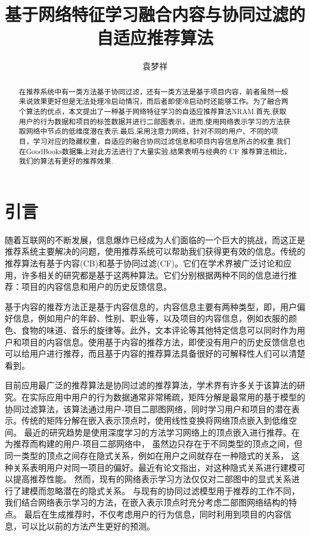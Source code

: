 \documentclass[lang=cn,11pt]{elegantpaper}
\title{基于网络特征学习融合内容与协同过滤的自适应推荐算法}
\author{袁梦祥}
\institute{安徽大学大数据与云服务工程实验室}
\date{}
\begin{document}
\maketitle

\begin{abstract}
	
\noindent 在推荐系统中有一类方法基于协同过滤，还有一类方法是基于项目内容，前者虽然一般来说效果更好但是无法处理冷启动情况，而后者即使冷启动时还能够工作。为了融合两个算法的优点，本文提出了一种基于网络特征学习的自适应推荐算法NRAM.首先,获取用户的行为数据和项目的标签数据并进行二部图表示，进而,使用网络表示学习的方法获取网络中节点的低维度潜在表示.最后,采用注意力网络，针对不同的用户、不同的项目，学习对应的隐藏权重，自适应的融合协同过滤信息和项目内容信息所占的权重.我们在GoodBooks数据集上对此方法进行了大量实验,结果表明与经典的 CF 推荐算法相比，我们的算法有更好的推荐效果.

\end{abstract}


\section{引言}

随着互联网的不断发展，信息爆炸已经成为人们面临的一个巨大的挑战，而这正是推荐系统主要解决的问题，使用推荐系统可以帮助我们获得更有效的信息。传统的推荐算法有基于内容(CB)和基于协同过滤(CF)。它们在学术界被广泛讨论和应用，许多相关的研究都是基于这两种算法。它们分别根据两种不同的信息进行推荐：项目的内容信息和用户的历史反馈信息。

基于内容的推荐方法正是基于内容信息的，内容信息主要有两种类型，即，用户偏好信息，例如用户的年龄、性别、职业等，以及项目的内容信息，例如衣服的颜色、食物的味道、音乐的旋律等。此外，文本评论等其他特定信息可以同时作为用户和项目的内容信息。使用基于内容的推荐方法，即使没有用户的历史反馈信息也可以给用户进行推荐，而且基于内容的推荐算法具备很好的可解释性\cite{Vig2008}人们可以清楚看到。

目前应用最广泛的推荐算法是协同过滤的推荐算法，学术界有许多关于该算法的研究\cite{Linden2003,Miranda2009,Sarwar2001a,Su2009}。在实际应用中用户的行为数据通常非常稀疏，矩阵分解是最常用的基于模型的协同过滤算法\cite{Salakhutdinov2007,Koren2009}，该算法通过用户-项目二部图网络，同时学习用户和项目的潜在表示。传统的矩阵分解在嵌入表示顶点时，使用线性变换将网络顶点嵌入到低维空间。
最近的研究趋势是使用深度学习的方法学习网络上的顶点嵌入\cite{He2017}进行推荐。在为推荐而构建的用户-项目二部网络中，
虽然边只存在于不同类型的顶点之间，但同一类型的顶点之间存在隐式关系，例如在用户之间就存在一种隐式的关系，
这种关系表明用户对同一项目的偏好。最近有论文指出，对这种隐式关系进行建模可以提高推荐性能\cite{Yu2018}。
然而，现有的网络表示学习方法\cite{Perozzi2014,Grover2016,Tang2015}仅仅对二部图中的显式关系进行了建模而忽略潜在的隐式关系。
与现有的协同过滤模型用于推荐的工作不同，我们结合网络表示学习的方法，在嵌入表示顶点时充分考虑二部图网络结构的特点。
最后在生成推荐时，不仅考虑用户的行为信息，同时利用到项目的内容信息，可以比以前的方法产生更好的预测。
\end{document}
